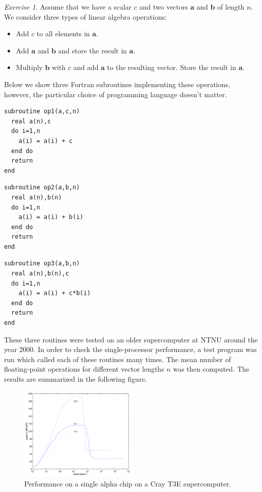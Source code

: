 \documentclass[onecolumn, oneside, a4paper, 11pt]{memoir}
\theoremstyle{remark}
\newtheorem{ex}{Exercise}
\begin{document}
\begin{ex}
  Assume that we have a scalar $c$ and two vectors $\bm a$ and $\bm b$ of length
  $n$. We consider three types of linear algebra operations:
  \begin{itemize}
  \item Add $c$ to all elements in $\bm a$.
  \item Add $\bm a$ and $\bm b$ and store the result in $\bm a$.
  \item Multiply $\bm b$ with $c$ and add $\bm a$ to the resulting vector. Store
    the result in $\bm a$.
  \end{itemize}

  Below we show three Fortran subroutines implementing these operations,
  however, the particular choice of programming language doesn't matter.
  \begin{lstlisting}[style=fortran]
subroutine op1(a,c,n)
  real a(n),c
  do i=1,n
    a(i) = a(i) + c
  end do
  return
end
  \end{lstlisting}
  \begin{lstlisting}[style=fortran]
subroutine op2(a,b,n)
  real a(n),b(n)
  do i=1,n
    a(i) = a(i) + b(i)
  end do
  return
end
  \end{lstlisting}
  \begin{lstlisting}[style=fortran]
subroutine op3(a,b,n)
  real a(n),b(n),c
  do i=1,n
    a(i) = a(i) + c*b(i)
  end do
  return
end
  \end{lstlisting}

  These three routines were tested on an older supercomputer at NTNU around the
  year 2000. In order to check the single-processor performance, a test program
  was run which called each of these routines many times. The mean number of
  floating-point operations for different vector lengths $n$ was then computed.
  The results are summarized in the following figure.

  \begin{figure}[htbp]
    \begin{center}
      \includegraphics[width=0.5\textwidth]{ctest}
    \end{center}
    \caption{Performance on a single alpha chip on a Cray T3E supercomputer.}
  \end{figure}


\end{ex}
\end{document}
